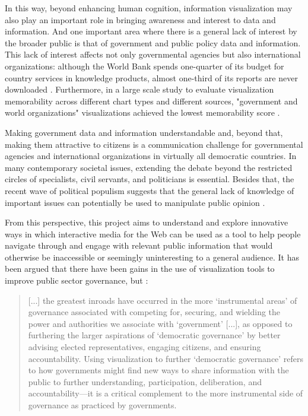\documentclass[manuscript, screen]{timtm}
\begin{document}
In this way, beyond enhancing human cognition, information visualization may also play an important role in bringing awareness and interest to data and information. And one important area where there is a general lack of interest by the broader public is that of government and public policy data and information. This lack of interest affects not only governmental agencies but also international organizations: although the World Bank spends one-quarter of its budget for country services in knowledge products, almost one-third of its reports are never downloaded \cite{doemeland2014world-bank}. Furthermore, in a large scale study to evaluate visualization memorability across different chart types and different sources, "government and world organizations" visualizations achieved the lowest memorability score \cite{BorkinMichelleA.2013WMaV-memorable-vis}.

Making government data and information understandable and, beyond that, making them attractive to citizens is a communication challenge for governmental agencies and international organizations in virtually all democratic countries. In many contemporary societal issues, extending the debate beyond the restricted circles of specialists, civil servants, and politicians is essential. Besides that, the recent wave of political populism suggests that the general lack of knowledge of important issues can potentially be used to manipulate public opinion \cite{oecd-government-glance}. 

From this perspective, this project aims to understand and explore innovative ways in which interactive media for the Web can be used as a tool to help people navigate through and engage with relevant public information that would otherwise be inaccessible or seemingly uninteresting to a general audience. It has been argued that there have been gains in the use of visualization tools to improve public sector governance, but \cite{visgov-Lindquist2018}:

\begin{quote}
    [...] the greatest inroads have occurred in the more ‘instrumental areas’ of governance associated with competing for, securing, and wielding the power and authorities we associate with ‘government’ [...], as opposed to furthering the larger aspirations of ‘democratic governance’ by better advising elected representatives, engaging citizens, and ensuring accountability. Using visualization to further ‘democratic governance’ refers to how governments might find new ways to share information with the public to further understanding, participation, deliberation, and accountability—it is a critical complement to the more instrumental side of governance as practiced by governments.
\end{quote}
\end{document}

